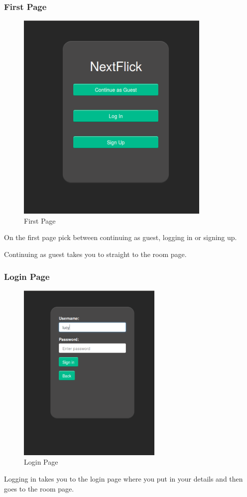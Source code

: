 \documentclass{article}
\begin{document}
\subsubsection{First Page}
\begin{figure}[H]
\centering
\caption{First Page}
\label{sec:sysarchitecture}
\includegraphics[scale=0.5]{firstpage}
\end{figure}
On the first page pick between continuing as guest, logging in or signing up.

Continuing as guest takes you to straight to the room page.
\subsubsection{Login Page}
\begin{figure}[H]
\centering
\caption{Login Page}
\label{sec:sysarchitecture}
\includegraphics[scale=0.60]{loginpage}
\end{figure}
Logging in takes you to the login page where you put in your details and then goes to the room page. 
\end{document}
